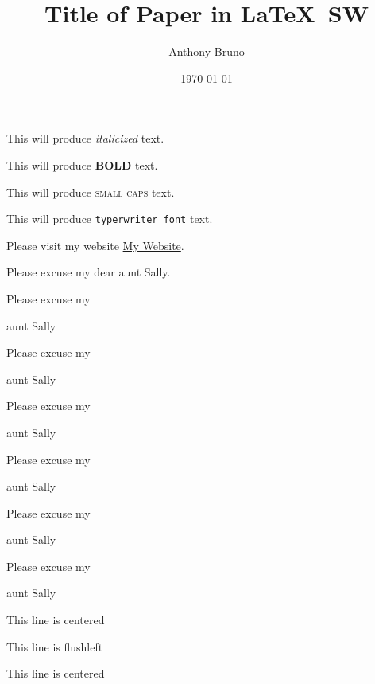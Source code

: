 \documentclass[11pt]{article}
\title{Title of Paper in \LaTeX\ SW}
\author{Anthony Bruno}
\date{\today}
\begin{document}
\tableofcontents

\maketitle

This will produce \textit{italicized} text.

This will produce \textbf{BOLD} text.

This will produce \textsc{small caps} text.

This will produce \texttt{typerwriter font} text.

Please visit my website \href{https://sites.google.com/view/anthony-bruno/research-papers-presentations-lab-logs}{My Website}.

\vspace{1cm}

Please excuse my dear aunt Sally.

Please excuse my \begin{Large} aunt Sally \end{Large}

Please excuse my \begin{LARGE} aunt Sally \end{LARGE}

Please excuse my \begin{Huge} aunt Sally \end{Huge}

Please excuse my \begin{normalsize} aunt Sally \end{normalsize}

Please excuse my \begin{scriptsize} aunt Sally \end{scriptsize}

Please excuse my \begin{tiny} aunt Sally \end{tiny}

\vspace{1cm}

\begin{center} This line is centered \end{center}

\begin{flushleft} This line is flushleft \end{flushleft}

\begin{flushright} This line is centered \end{flushright}
\end{document}

